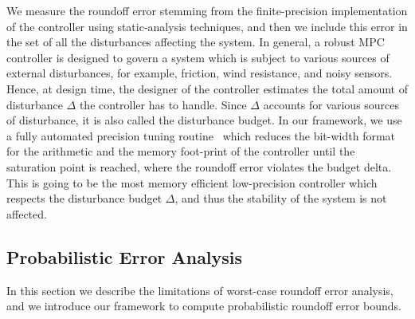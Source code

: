 %
We measure the roundoff error stemming from the finite-precision implementation of the controller using static-analysis techniques, and then we include this error in the set of all the disturbances affecting the system.
%
In general, a robust MPC controller is designed to govern a system which is subject to various sources of external disturbances, for example, friction, wind resistance, and noisy sensors.
%
Hence, at design time, the designer of the controller estimates the total amount of disturbance $\Delta$ the controller has to handle.
%
Since $\Delta$ accounts for various sources of disturbance, it is also called the \textquotesingle\textquotesingle disturbance budget\textquotesingle\textquotesingle.
%
%
In our framework, we use a fully automated precision tuning routine~\cite{fptuner} which reduces the bit-width format for the arithmetic and the memory foot-print of the controller until the saturation point is reached, where the roundoff error violates the budget delta.
%
This is going to be the most memory efficient low-precision controller which respects the disturbance budget $\Delta$, and thus the stability of the system is not affected.
%

%
%  
%  
%
%
%
%
\subsection{Probabilistic Error Analysis}
\label{sec:prob}
%
In this section we describe the limitations of worst-case roundoff error analysis, and we introduce our framework to compute probabilistic roundoff error bounds.
%

